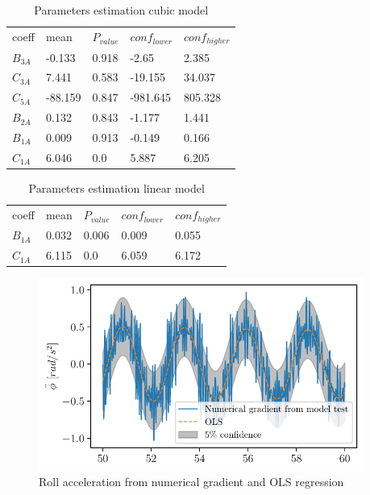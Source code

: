 \begin{table}[H]
\scriptsize
\center
\caption{Parameters estimation cubic model}
\label{tab:parameters3}
\begin{tabular}{|l|l|l|l|l|}
\hline\addlinespace
coeff & mean & $P_{value}$ & $conf_{lower}$ & $conf_{higher}$\\
$B_{3A}$ & -0.133 & 0.918 & -2.65 & 2.385\\
\hline$C_{3A}$ & 7.441 & 0.583 & -19.155 & 34.037\\
$C_{5A}$ & -88.159 & 0.847 & -981.645 & 805.328\\
$B_{2A}$ & 0.132 & 0.843 & -1.177 & 1.441\\
$B_{1A}$ & 0.009 & 0.913 & -0.149 & 0.166\\
$C_{1A}$ & 6.046 & 0.0 & 5.887 & 6.205\\
\hline
\end{tabular}
\end{table}
\begin{table}[H]
\scriptsize
\center
\caption{Parameters estimation linear model}
\label{tab:parameters4}
\begin{tabular}{|l|l|l|l|l|}
\hline\addlinespace
coeff & mean & $P_{value}$ & $conf_{lower}$ & $conf_{higher}$\\
$B_{1A}$ & 0.032 & 0.006 & 0.009 & 0.055\\
\hline$C_{1A}$ & 6.115 & 0.0 & 6.059 & 6.172\\
\hline
\end{tabular}
\end{table}
\begin{figure}[H]
\begin{center}\includegraphics[width = 0.95\textwidth]{figures/roll_acceleration_ols.pdf}\end{center}
\vspace{-0.7cm}
\caption{Roll acceleration from numerical gradient and OLS regression}
\label{fig:roll_acceleration_ols}
\end{figure}
